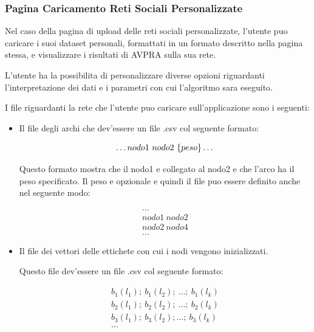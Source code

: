 \documentclass[a4paper,12pt]{report}
\begin{document}
			\subsubsection{Pagina Caricamento Reti Sociali Personalizzate}
			Nel caso della pagina di upload delle reti sociali personalizzate, l'utente puo caricare i suoi dataset personali, formattati in un formato descritto nella pagina stessa, e visualizzare i risultati di AVPRA sulla sua rete. \par
			L'utente ha la possibilita di personalizzare diverse opzioni riguardanti l'interpretazione dei dati e i parametri con cui l'algoritmo sara eseguito. \par
			I file riguardanti la rete che l'utente puo caricare sull'applicazione sono i seguenti:
			\begin{itemize}
				\item Il file degli archi che dev'essere un file .csv col seguente formato: \par
				\begin{equation}
				\dots \\
				nodo1\ nodo2\ \{ peso \} \\
				\dots
				\end{equation}

				Questo formato mostra che il nodo1 e collegato al nodo2 e che l'arco ha il peso specificato. Il peso e opzionale e quindi il file puo essere definito anche nel seguente modo: \par
				\begin{equation}
				\begin{aligned}
				\dots \\
				nodo1\  nodo2 \\
				nodo2\  nodo4 \\
				\dots
				\end{aligned}
				\end{equation}				

				\item Il file dei vettori delle ettichete con cui i nodi vengono inizializzati. \par
				Questo file dev'essere un file .csv col seguente formato: \par
				\begin{equation}
				\begin{aligned}
				b_1(l_1);\ b_1(l_2);\ \dots;\ b_1(l_k) \\
				b_2(l_1);\ b_2(l_2);\ \dots;\ b_2(l_k) \\
				b_3(l_1);\ b_3(l_2); \dots;\ b_3(l_k) \\
				\dots
				\end{aligned}
				\end{equation}
				

\end{itemize}
\end{document}

